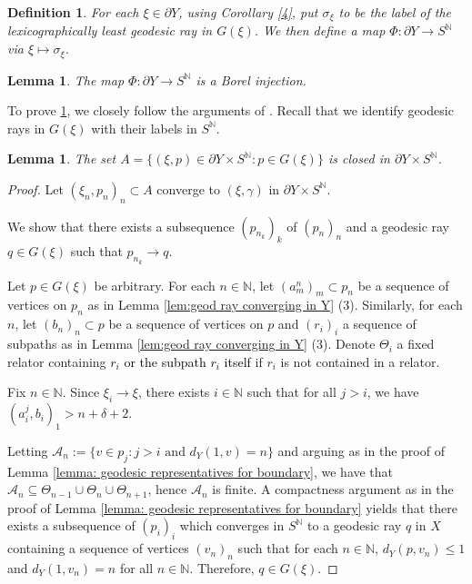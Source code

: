 \documentclass{article}[11pt]
\newtheorem{defn}[thm]{Definition}
\newtheorem{lem}[thm]{Lemma}
\newcommand{\N}{\mathbb{N}}
\begin{document}
{\begin{defn}
    For each $\xi \in \partial Y$, using Corollary \ref{4}, put $\sigma_{\xi}$ to be the label of the lexicographically least geodesic ray in $G(\xi)$. %
    We then define a map $\Phi : \partial Y \to S^{\N}$ via $\xi \mapsto \sigma_{\xi}$. 
\end{defn}

\begin{lem}
    \label{Borel inj}
    The map $\Phi : \partial Y \to S^{\N}$ is a Borel injection.
\end{lem}

To prove \ref{Borel inj}, we closely follow the arguments of \cite[Proposition 3.3]{NaryshVacc}. Recall that we identify geodesic rays in $G(\xi)$ with their labels in $S^{\N}$.

\begin{lem}
    \label{closed}
    The set $A = \{(\xi, p) \in \partial Y \times S^{\N}: p \in G(\xi)\}$ is closed in $\partial Y \times S^{\N}$.
\end{lem}

\begin{proof}

Let $(\xi_n, p_n)_n \subset A$ converge to $(\xi, \gamma) $ in $\partial Y \times S^{\N}$. 

    We show that there exists a subsequence $(p_{n_k})_k$ of $(p_n)_n$ and a geodesic ray $q \in G(\xi)$ such that $p_{n_k} \to q$.

    Let $p \in G(\xi)$ be arbitrary. For each $n \in \N$, let $(a_m^n)_m \subset p_n$ be a sequence of vertices on $p_n$ as in Lemma \ref{lem:geod ray converging in Y} (3). Similarly, for each $n$, let $(b_n)_n \subset p$ be a sequence of vertices on $p$ and $(r_i)_i$ a sequence of subpaths as in Lemma \ref{lem:geod ray converging in Y} (3). Denote $\Theta_i$ a fixed relator containing \textcolor{black}{$r_i$ or the subpath $r_i$ itself} if $r_i$ is not contained in a relator. 
    
    Fix $n \in \N$. Since $\xi_i \to \xi$, there exists $i \in \N$ such that for all $j > i$, we have $(a_i^j, b_i)_1 > n + \delta + 2$. 

    Letting $\mathcal{A}_n := \{v \in p_j : j > i \text{ and } d_Y(1,v) = n\}$ and arguing as in the proof of Lemma \ref{lemma: geodesic representatives for boundary}, we have that $\mathcal{A}_n \subseteq \Theta_{n-1} \cup \Theta_n \cup \Theta_{n+1}$, hence $\mathcal{A}_n$ is finite. A compactness argument as in the proof of Lemma \ref{lemma: geodesic representatives for boundary} yields that there exists a subsequence of $(p_i)_i$ which converges in $S^{\N}$ to a geodesic ray $q$ in $X$ containing a sequence of vertices $(v_n)_n$ such that for each $n \in \N$, $d_Y(p,v_n) \leq 1$ and $d_Y(1,v_n) = n$ for all $n \in \N$. Therefore, $q \in G(\xi)$. 


\end{proof}}
\end{document}
